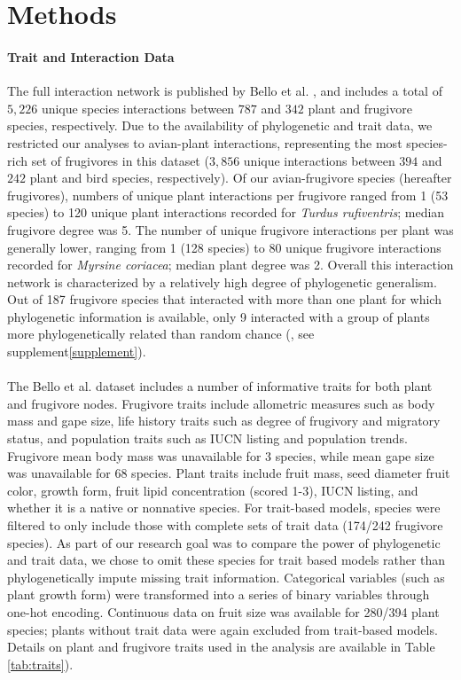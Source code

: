 \section*{Methods}

\paragraph{Trait and Interaction Data}
The full interaction network is published by Bello et al. \cite{bello2017}, and includes a total of $5,226$ unique species interactions between $787$ and $342$ plant and frugivore species, respectively. Due to the availability of phylogenetic and trait data, we restricted our analyses to avian-plant interactions, representing the most species-rich set of frugivores in this dataset ($3,856$ unique interactions between $394$ and $242$ plant and bird species, respectively). Of our avian-frugivore species (hereafter frugivores), numbers of unique plant interactions per frugivore ranged from 1 (53 species) to 120 unique plant interactions recorded for \emph{Turdus rufiventris}; median frugivore degree was 5. The number of unique frugivore interactions per plant was generally lower, ranging from 1 (128 species) to 80 unique frugivore interactions recorded for \emph{Myrsine coriacea}; median plant degree was 2. Overall this interaction network is characterized by a relatively high degree of phylogenetic generalism. Out of 187 frugivore species that interacted with more than one plant for which phylogenetic information is available, only 9 interacted with a group of plants more phylogenetically related than random chance (\cite{kembel2010picante}, see supplement\ref{supplement}). 

\paragraph*{}
The Bello et al. dataset includes a number of informative traits for both plant and frugivore nodes. Frugivore traits include allometric measures such as body mass and gape size, life history traits such as degree of frugivory and migratory status, and population traits such as  IUCN listing and population trends. Frugivore mean body mass was unavailable for 3 species, while mean gape size was unavailable for 68 species. Plant traits include fruit mass, seed diameter fruit color, growth form, fruit lipid concentration (scored 1-3), IUCN listing, and whether it is a native or nonnative species. For trait-based models, species were filtered to only include those with complete sets of trait data (174/242 frugivore species). As part of our research goal was to compare the power of phylogenetic and trait data, we chose to omit these species for trait based models rather than phylogenetically impute missing trait information. Categorical variables (such as plant growth form) were transformed into a series of binary variables through one-hot encoding. Continuous data on fruit size was available for 280/394 plant species; plants without trait data were again excluded from trait-based models. Details on plant and frugivore traits used in the analysis are available in Table \ref{tab:traits}). 
    


